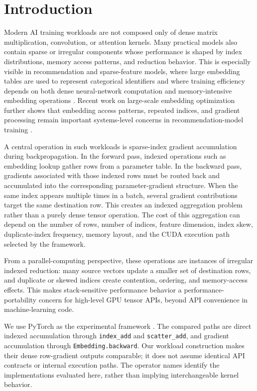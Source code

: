 \section{Introduction}

Modern AI training workloads are not composed only of dense matrix multiplication, convolution, or attention kernels. Many practical models also contain sparse or irregular components whose performance is shaped by index distributions, memory access patterns, and reduction behavior. This is especially visible in recommendation and sparse-feature models, where large embedding tables are used to represent categorical identifiers and where training efficiency depends on both dense neural-network computation and memory-intensive embedding operations \citep{naumov2019dlrm,gupta2020architectural}. Recent work on large-scale embedding optimization further shows that embedding access patterns, repeated indices, and gradient processing remain important systems-level concerns in recommendation-model training \citep{liu2024embark}.

A central operation in such workloads is sparse-index gradient accumulation during backpropagation. In the forward pass, indexed operations such as embedding lookup gather rows from a parameter table. In the backward pass, gradients associated with those indexed rows must be routed back and accumulated into the corresponding parameter-gradient structure. When the same index appears multiple times in a batch, several gradient contributions target the same destination row. This creates an indexed aggregation problem rather than a purely dense tensor operation. The cost of this aggregation can depend on the number of rows, number of indices, feature dimension, index skew, duplicate-index frequency, memory layout, and the CUDA execution path selected by the framework.

From a parallel-computing perspective, these operations are instances of irregular indexed reduction: many source vectors update a smaller set of destination rows, and duplicate or skewed indices create contention, ordering, and memory-access effects. This makes stack-sensitive performance behavior a performance-portability concern for high-level GPU tensor APIs, beyond API convenience in machine-learning code.

We use PyTorch as the experimental framework \citep{paszke2019pytorch}. The compared paths are direct indexed accumulation through \texttt{index\_add} and \texttt{scatter\_add}, and gradient accumulation through \texttt{Embedding.backward}. Our workload construction makes their dense row-gradient outputs comparable; it does not assume identical API contracts or internal execution paths. The operator names identify the implementations evaluated here, rather than implying interchangeable kernel behavior.

